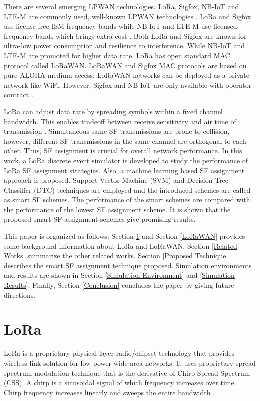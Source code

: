 \documentclass[conference]{IEEEtran}
\begin{document}
There are several emerging LPWAN technologies. LoRa, Sigfox, NB-IoT and LTE-M are commonly used, well-known LPWAN technologies \cite{7815384}. LoRa and Sigfox use license free ISM frequency bands while NB-IoT and LTE-M use licensed frequency bands which brings extra cost \cite{7815384}. Both LoRa and Sigfox are known for ultra-low power consumption and resilience to interference. While NB-IoT and LTE-M are promoted for higher data rate. LoRa has open standard MAC protocol called LoRaWAN. LoRaWAN and Sigfox MAC protocols are based on pure ALOHA medium access. LoRaWAN networks can be deployed as a private network like WiFi. However, Sigfox and NB-IoT are only available with operator contract \cite{7815384}.

LoRa can adjust data rate by spreading symbols within a fixed channel bandwidth. This enables tradeoff between receive sensitivity and air time of transmission \cite{7803607}. Simultaneous same SF transmissions are prone to collision, however, different SF transmissions in the same channel are orthogonal to each other. Thus, SF assignment is crucial for overall network performance. In this work, a LoRa discrete event simulator is developed to study the performance of LoRa SF assignment strategies. Also, a machine learning based SF assignment approach is proposed. Support Vector Machine (SVM) and Decision Tree Classifier (DTC) techniques are employed and the introduced schemes are called as smart SF schemes. The performance of the smart schemes are compared with the performance of the lowest SF assignment scheme. It is shown that the proposed smart SF assignment schemes give promising results.

This paper is organized as follows: Section \ref{LoRa} and Section \ref{LoRaWAN} provides some background information about LoRa and LoRaWAN. Section \ref{Related Works} summarize  the other related works. Section \ref{Proposed Technique} describes the smart SF assignment technique proposed. Simulation environments and results are shown in Section \ref{Simulation Environment} and \ref{Simulation Results}. Finally, Section \ref{Conclusion} concludes the paper by giving future directions.


\section{LoRa} \label{LoRa}
LoRa is a proprietary physical layer radio/chipset technology that provides wireless link solution for low power wide area networks. It uses proprietary spread spectrum modulation technique that is the derivative of Chirp Spread Spectrum (CSS). A chirp is a sinusoidal signal of which frequency increases over time. Chirp frequency increases linearly and sweeps the entire bandwidth \cite{AN1200.22}.
\end{document}
